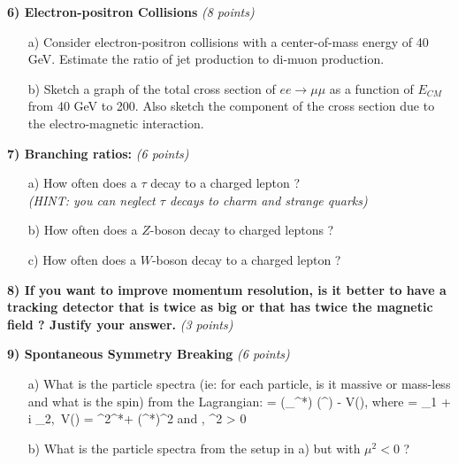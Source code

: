 {\textbf{6) Electron-positron Collisions } \hfill \textit{(8 points)}\\
\begin{itemize}
\item[a)]{Consider electron-positron collisions with a center-of-mass  energy of 40 GeV.
Estimate the ratio of jet production to di-muon production. 
\vspace*{0.5in}
}
\item[b)]{Sketch a graph of the total cross section of $ee\rightarrow\mu\mu$ as a function of $E_{CM}$ from 40 GeV to 200. 
Also sketch the component of the cross section due to the electro-magnetic interaction.
\vspace*{0.5in}
}
\end{itemize}

\clearpage

\textbf{7) Branching ratios:  } \hfill \textit{(6 points)}\\
\begin{itemize}
\item[a)]{How often does a $\tau$ decay to a charged lepton ? \\ \textit{(HINT: you can neglect $\tau$ decays to charm and strange quarks) }  
\vspace*{0.5in}
}
\item[b)]{How often does a $Z$-boson decay to charged leptons ?
\vspace*{0.5in}
}
\item[c)]{How often does a $W$-boson decay to a charged lepton ?
\vspace*{0.5in}
}
\end{itemize}


\textbf{8) If you want to improve momentum resolution, is it better to have a tracking detector that is twice as big or that has twice the magnetic field ?  Justify your answer.} \hfill \textit{(3 points)}\\
\vspace*{0.5in}


\textbf{9) Spontaneous Symmetry Breaking  } \hfill \textit{(6 points)}\\
\begin{itemize}
\item[a)]{ What is the particle spectra (ie: for each particle, is it massive or mass-less and what is the spin) from the Lagrangian: \be{} = (\partial_\mu \phi^*) (\partial^\mu \phi) - V(\phi), \textrm{ where } \phi = \phi_1 + i \phi_2,\  V(\phi) = \mu^2\phi^*\phi + \lambda (\phi^*\phi)^2\textrm { and } \lambda, \mu^2 > 0   \ee
\vspace{0.5in}
}
\item[b)]{ What is the particle spectra from the setup in a) but with $\mu^2 < 0$ ?
\vspace{0.5in}
}
\end{itemize}


}
